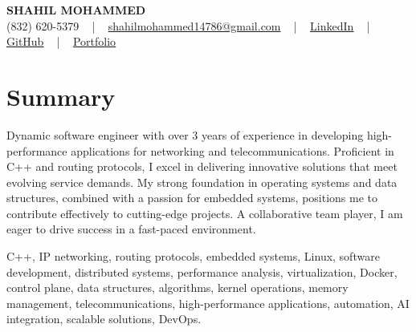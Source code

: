 \documentclass[letterpaper,10pt]{article}
\begin{document}
\begin{center}
    {\fontsize{14pt}{12pt}\selectfont \textbf{\MakeUppercase{Shahil Mohammed}}}\\ \vspace{2pt}
    \fontsize{10pt}{12pt}\selectfont (832) 620-5379 ~ | ~ \href{mailto:shahilmohammed14786@gmail.com}{shahilmohammed14786@gmail.com} ~ | ~  
    \href{https://www.linkedin.com/in/shahil-mohammed-9652931a1/}{\color{blue}\underline{LinkedIn}}  ~ | ~ 
    \href{https://github.com/freakbeast14}{\color{blue}\underline{GitHub}} ~ | ~ 
    \href{https://shahil-mohammed.netlify.app/}{\color{blue}\underline{Portfolio}}
    \vspace{-8pt}
\end{center}

\section{Summary}
\vspace{-2pt}\fontsize{8pt}{9pt}\selectfont
Dynamic software engineer with over 3 years of experience in developing high-performance applications for networking and telecommunications. Proficient in C++ and routing protocols, I excel in delivering innovative solutions that meet evolving service demands. My strong foundation in operating systems and data structures, combined with a passion for embedded systems, positions me to contribute effectively to cutting-edge projects. A collaborative team player, I am eager to drive success in a fast-paced environment.
 \vspace{-5pt}
 
{\fontsize{1pt}{1pt}\selectfont\color{white}
C++, IP networking, routing protocols, embedded systems, Linux, software development, distributed systems, performance analysis, virtualization, Docker, control plane, data structures, algorithms, kernel operations, memory management, telecommunications, high-performance applications, automation, AI integration, scalable solutions, DevOps.
}
\vspace{-8pt}

\vspace{-2pt}
\end{document}
